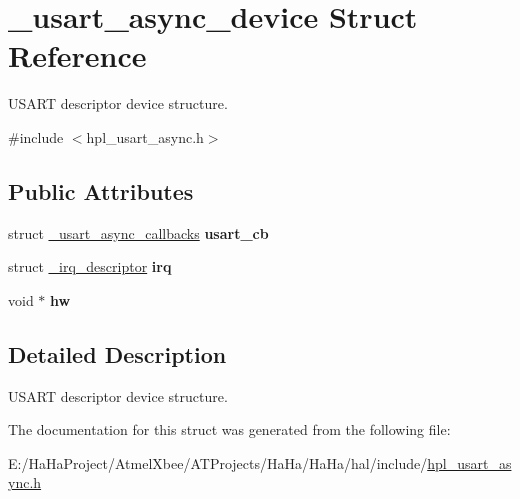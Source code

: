 \hypertarget{struct__usart__async__device}{}\section{\+\_\+usart\+\_\+async\+\_\+device Struct Reference}
\label{struct__usart__async__device}


U\+S\+A\+RT descriptor device structure.  




{\ttfamily \#include $<$hpl\+\_\+usart\+\_\+async.\+h$>$}

\subsection*{Public Attributes}
\begin{DoxyCompactItemize}
\item 
\mbox{\label{struct__usart__async__device_af36f1abd8113ed4a2f06a9084519f369}} 
struct \hyperlink{struct__usart__async__callbacks}{\+\_\+usart\+\_\+async\+\_\+callbacks} {\bfseries usart\+\_\+cb}
\item 
\mbox{\label{struct__usart__async__device_a0eb2cf8aa3661fe0a22168429c04bf57}} 
struct \hyperlink{struct__irq__descriptor}{\+\_\+irq\+\_\+descriptor} {\bfseries irq}
\item 
\mbox{\label{struct__usart__async__device_a3eae9af22755ddfe25f8406c2939262f}} 
void $\ast$ {\bfseries hw}
\end{DoxyCompactItemize}


\subsection{Detailed Description}
U\+S\+A\+RT descriptor device structure. 

The documentation for this struct was generated from the following file\+:\begin{DoxyCompactItemize}
\item 
E\+:/\+Ha\+Ha\+Project/\+Atmel\+Xbee/\+A\+T\+Projects/\+Ha\+Ha/\+Ha\+Ha/hal/include/\hyperlink{hpl__usart__async_8h}{hpl\+\_\+usart\+\_\+async.\+h}\end{DoxyCompactItemize}

